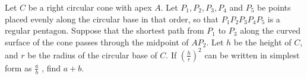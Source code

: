 Let $C$ be a right circular cone with apex $A$. Let $P_1, P_2, P_3, P_4$ and $P_5$ be points placed evenly along the circular base in that order, so that $P_1P_2P_3P_4P_5$ is a regular pentagon. Suppose that the shortest path from $P_1$ to $P_3$ along the curved surface of the cone passes through the midpoint of $AP_2$. Let $h$ be the height of $C$, and $r$ be the radius of the circular base of $C$. If $\left(\frac{h}{r}\right)^2$ can be written in simplest form as $\frac{a}{b}$ , find $a + b$.